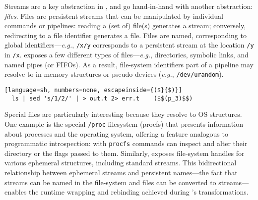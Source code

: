 \documentclass[sigplan,10pt,review,anonymous]{acmart}
\newcommand{\eg}{{\em e.g.}, }
\newcommand{\ttt}[1]{\texttt{\small #1}}
\begin{document}
Streams are a key abstraction in \unix, and go hand-in-hand with another \unix abstraction: \emph{files}.
Files are persistent streams that can be manipulated by individual commands or pipelines:
  reading a (set of) file(s) generates a stream; 
  conversely, redirecting to a file identifier generates a file.
Files are named, corresponding to global identifiers---\eg \ttt{/x/y} corresponds to a persistent stream at the location \ttt{/y} in \ttt{/x}.
\unix exposes a few different types of files---\eg directories, symbolic links, and named pipes (or FIFOs). %
As a result, file-system identifiers part of a pipeline may resolve to in-memory structures or pseudo-devices (\eg \ttt{/dev/urandom}).

\smallskip
\begin{lstlisting}[language=sh, numbers=none, escapeinside={($}{$)}]
  ls | sed 's/1/2/' | > out.t 2> err.t    ($$(p_3)$$)
\end{lstlisting}
\smallskip

\noindent
Special files are particularly interesting because they resolve to OS structures.
One example is the special \ttt{/proc} filesystem (procfs) that presents information about processes and the operating system, offering a feature analogous to programmatic introspection:
  with \ttt{procfs} commands can inspect and alter their directory or the flags passed to them.
Similarly, \unix exposes file-system handles for various ephemeral structures, including standard streams.
This bidirectional relationship between ephemeral streams and persistent names---the fact that streams can be named in the file-system and files can be converted to streams---enables the runtime wrapping and rebinding achieved during \sys's transformations.
\end{document}
